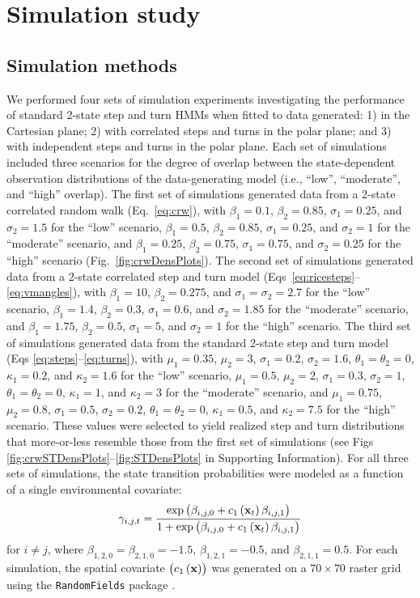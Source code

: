 \documentclass[12pt]{article}\usepackage[]{graphicx}\usepackage[]{xcolor}
\begin{document}
\section{Simulation study}
\subsection{Simulation methods}
We performed four sets of simulation experiments investigating the performance of standard 2-state step and turn HMMs when fitted to data generated: 1) in the Cartesian plane; 2) with correlated steps and turns in the polar plane; and 3) with independent steps and turns in the polar plane. Each set of simulations included three scenarios for the degree of overlap between the state-dependent observation distributions of the data-generating model (i.e., ``low'', ``moderate'', and ``high'' overlap). The first set of simulations generated data from a 2-state correlated random walk (Eq.\ \ref{eq:crw}), with $\beta_1=0.1$, $\beta_2=0.85$, $\sigma_1=0.25$, and $\sigma_2=1.5$ for the ``low'' scenario, $\beta_1=0.5$, $\beta_2=0.85$, $\sigma_1=0.25$, and $\sigma_2=1$ for the ``moderate'' scenario, and $\beta_1=0.25$, $\beta_2=0.75$, $\sigma_1=0.75$, and $\sigma_2=0.25$ for the ``high'' scenario (Fig.\ \ref{fig:crwDensPlots}). The second set of simulations generated data from a 2-state correlated step and turn model (Eqs\ \ref{eq:ricesteps}--\ref{eq:vmangles}), with $\beta_1=10$, $\beta_2=0.275$, and $\sigma_1=\sigma_2=2.7$ for the ``low'' scenario, $\beta_1=1.4$, $\beta_2=0.3$, $\sigma_1=0.6$, and $\sigma_2=1.85$ for the ``moderate'' scenario, and $\beta_1=1.75$, $\beta_2=0.5$, $\sigma_1=5$, and $\sigma_2=1$ for the ``high'' scenario. The third set of simulations generated data from the standard 2-state step and turn model (Eqs \ref{eq:steps}--\ref{eq:turns}), with $\mu_1=0.35$, $\mu_2=3$, $\sigma_1=0.2$, $\sigma_2=1.6$, $\theta_1=\theta_2=0$, $\kappa_1=0.2$, and $\kappa_2=1.6$ for the ``low'' scenario, $\mu_1=0.5$, $\mu_2=2$, $\sigma_1=0.3$, $\sigma_2=1$, $\theta_1=\theta_2=0$, $\kappa_1=1$, and $\kappa_2=3$ for the ``moderate'' scenario, and $\mu_1=0.75$, $\mu_2=0.8$, $\sigma_1=0.5$, $\sigma_2=0.2$, $\theta_1=\theta_2=0$, $\kappa_1=0.5$, and $\kappa_2=7.5$ for the ``high'' scenario. These values were selected to yield realized step and turn distributions that more-or-less resemble those from the first set of simulations (see Figs \ref{fig:crwSTDensPlots}--\ref{fig:STDensPlots} in Supporting Information). For all three sets of simulations, the state transition probabilities were modeled as a function of a single environmental covariate:
\begin{equation}
  \label{eq:simtpm}
  \gamma_{i,j,t} = \frac{\exp \left(\beta_{i,j,0}+c_1\left({\bf x}_t\right) \beta_{i,j,1}\right)}{1+\exp \left(\beta_{i,j,0}+c_1\left({\bf x}_t\right) \beta_{i,j,1}\right)}
\end{equation}
for $i \ne j$, where $\beta_{1,2,0}=\beta_{2,1,0}=-1.5$, $\beta_{1,2,1}=-0.5$, and $\beta_{2,1,1}=0.5$. For each simulation, the spatial covariate $\left(c_1\left({\bf x}\right)\right)$ was generated on a $70 \times 70$ raster grid using the %
\verb|RandomFields| package \citep[][]{SchlatherEtAl2015}.
\end{document}
